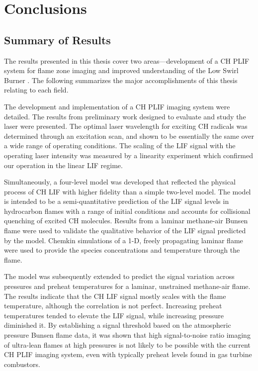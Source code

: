 \chapter{Conclusions}
\label{ch:conclusions}

\section{Summary of Results}

The results presented in this thesis cover two areas---development of a CH PLIF system for flame zone imaging and improved understanding of the Low Swirl Burner .
The following summarizes the major accomplishments of this thesis relating to each field.

The development and implementation of a CH PLIF imaging system were detailed.
The results from preliminary work designed to evaluate and study the laser were presented.
The optimal laser wavelength for exciting CH radicals was determined through an excitation scan, and shown to be essentially the same over a wide range of operating conditions.
The scaling of the LIF signal with the operating laser intensity was measured by a linearity experiment which confirmed our operation in the linear LIF regime.

Simultaneously, a four-level model was developed that reflected the physical process of CH LIF with higher fidelity than a simple two-level model.
The model is intended to be a semi-quantitative prediction of the LIF signal levels in hydrocarbon flames with a range of initial conditions and accounts for collisional quenching of excited CH molecules.
Results from a laminar methane-air Bunsen flame were used to validate the qualitative behavior of the LIF signal predicted by the model.
Chemkin simulations of a 1-D, freely propagating laminar flame were used to provide the species concentrations and temperature through the flame.

The model was subsequently extended to predict the signal variation across pressures and preheat temperatures for a laminar, unstrained methane-air flame.
The results indicate that the CH LIF signal mostly scales with the flame temperature, although the correlation is not perfect.
Increasing preheat temperatures tended to elevate the LIF signal, while increasing pressure diminished it.
By establishing a signal threshold based on the atmospheric pressure Bunsen flame data, it was shown that high signal-to-noise ratio imaging of ultra-lean flames at high pressures is not likely to be possible with the current CH PLIF imaging system, even with typically preheat levels found in gas turbine combustors.


